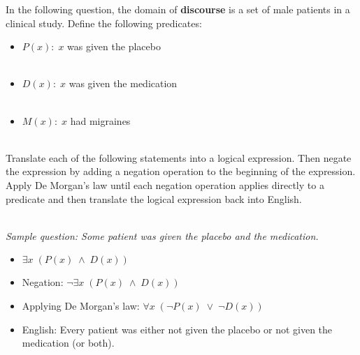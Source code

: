\documentclass{amsart}
\theoremstyle{definition}
\theoremstyle{Exercise}
\theoremstyle{remark}
\theoremstyle{rule}
\numberwithin{equation}{section}
\begin{document}
In the following question, the domain of {\bf discourse} is a set of male patients in a clinical study. Define the following predicates:\\
\begin{itemize}
  \item $P(x):\; x$ was given the placebo\\\\
  \item $D(x):\; x$ was given the medication\\\\
  \item $M(x): \; x$ had migraines\\\\
\end{itemize}
Translate each of the following statements into a logical expression. Then negate the expression by adding a negation operation to the beginning of the expression. Apply De Morgan's law until each negation operation applies directly to a predicate and then translate the logical expression back into English.\\\\

{\it
Sample question: Some patient was given the placebo and the medication.\\
\begin{itemize}
  \item $\exists x\; (P(x)\; \land \; D(x))$\\
  \item Negation: $\neg \exists x\; (P(x)\; \land \; D(x))$\\
  \item Applying De Morgan's law: $\forall x\; (\neg P(x)\; \lor \; \neg D(x))$\\
  \item English: Every patient was either not given the placebo or not given the medication (or both).\\
\end{itemize}
}
\newpage
\end{document}
